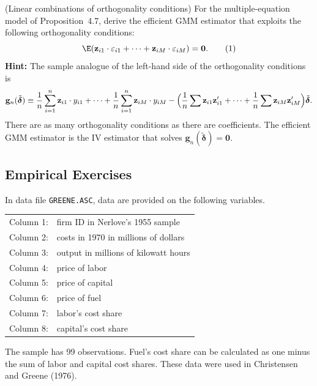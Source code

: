 \begin{problemset}
\exercise[11]
(Linear combinations of orthogonality conditions)\quad
For the multiple-equation model of Proposition~4.7, derive the efficient GMM
estimator that exploits the following orthogonality conditions:
\begin{equation}
\E(\mathbf{z}_{i1} \cdot \varepsilon_{i1} + \cdots
+ \mathbf{z}_{iM} \cdot \varepsilon_{iM}) = \mathbf{0}.
\tag{1}
\end{equation}
\textbf{Hint:} The sample analogue of the left-hand side of the orthogonality conditions is
\[
\mathbf{g}_n(\tilde{\boldsymbol{\delta}})
\equiv \frac{1}{n} \sum_{i=1}^{n} \mathbf{z}_{i1} \cdot y_{i1}
+ \cdots + \frac{1}{n} \sum_{i=1}^{n} \mathbf{z}_{iM} \cdot y_{iM}
- \Bigl(\frac{1}{n} \sum \mathbf{z}_{i1} \mathbf{z}_{i1}'
+ \cdots + \frac{1}{n} \sum \mathbf{z}_{iM} \mathbf{z}_{iM}'\Bigr)
\tilde{\boldsymbol{\delta}}.
\]
There are as many orthogonality conditions as there are coefficients.
The efficient GMM estimator is the IV estimator that solves
$\mathbf{g}_n(\tilde{\boldsymbol{\delta}}) = \mathbf{0}$.

\bigskip
\subsection*{Empirical Exercises}

In data file \texttt{GREENE.ASC}, data are provided on the following variables.

\medskip
\begin{tabular}{@{}ll@{}}
Column 1: & firm ID in Nerlove's 1955 sample \\
Column 2: & costs in 1970 in millions of dollars \\
Column 3: & output in millions of kilowatt hours \\
Column 4: & price of labor \\
Column 5: & price of capital \\
Column 6: & price of fuel \\
Column 7: & labor's cost share \\
Column 8: & capital's cost share
\end{tabular}
\medskip

The sample has 99 observations. Fuel's cost share can be calculated as one minus
the sum of labor and capital cost shares. These data were used in Christensen and
Greene (1976).


\end{problemset}
